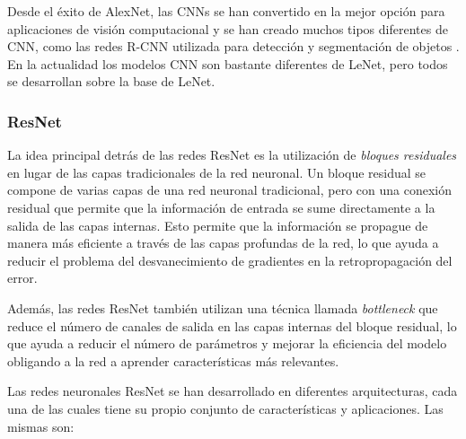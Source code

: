 Desde el éxito de AlexNet, las CNNs se han convertido en la mejor opción para aplicaciones de visión computacional y se
han creado muchos tipos diferentes de CNN, como las redes R-CNN utilizada para detección y segmentación de objetos \parencite{girshick2014rich}. En la actualidad los modelos CNN son bastante diferentes de LeNet, pero todos se desarrollan
sobre la base de LeNet.

\subsubsection{ResNet}

La idea principal detrás de las redes ResNet es la utilización de {\it bloques residuales} en lugar de las capas
tradicionales de la red neuronal. Un bloque residual se compone de varias capas de una red neuronal tradicional, pero
con una conexión residual que permite que la información de entrada se sume directamente a la salida de las capas
internas. Esto permite que la información se propague de manera más eficiente a través de las capas profundas de la
red, lo que ayuda a reducir el problema del desvanecimiento de gradientes en la retropropagación del error.

Además, las redes ResNet también utilizan una técnica llamada {\it bottleneck} que reduce el número de canales de
salida en las capas internas del bloque residual, lo que ayuda a reducir el número de parámetros y mejorar la
eficiencia del modelo obligando a la red a aprender características más relevantes.

Las redes neuronales ResNet se han desarrollado en diferentes arquitecturas, cada una de las cuales tiene su propio
conjunto de características y aplicaciones. Las mismas son:

